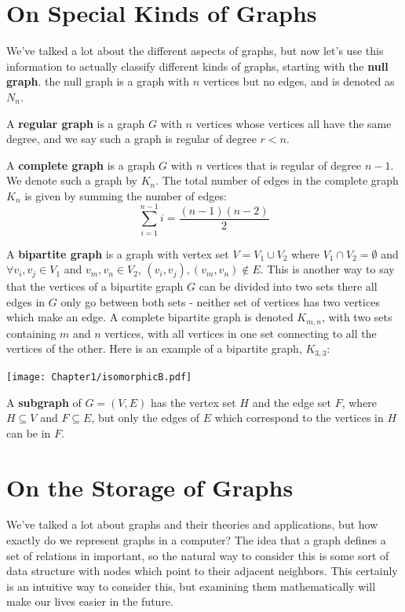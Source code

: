 \section{On Special Kinds of Graphs}
We've talked a lot about the different aspects of graphs, but now let's use this information to actually classify different kinds of graphs, starting with the \textbf{null graph}. the null graph is a graph with $n$ vertices but no edges, and is denoted as $N_n$.

A \textbf{regular graph} is a graph $G$ with $n$ vertices whose vertices all have the same degree, and we say such a graph is regular of degree $r < n$.

A \textbf{complete graph} is a graph $G$ with $n$ vertices that is regular of degree $n-1$. We denote such a graph by $K_n$. The total number of edges in the complete graph $K_n$ is given by summing the number of edges: 
\begin{equation*}
    \sum_{i=1}^{n-1} i = \frac{(n-1)(n-2)}{2}
\end{equation*}

A \textbf{bipartite graph} is a graph with vertex set $V = V_1 \cup V_2$ where $V_1 \cap V_2 = \emptyset$ and $\forall v_i, v_j \in V_1$ and $v_m, v_n \in V_2$, $(v_i, v_j), (v_m, v_n) \not\in E$. This is another way to say that the vertices of a bipartite graph $G$ can be divided into two sets there all edges in $G$ only go between both sets - neither set of vertices has two vertices which make an edge. A complete bipartite graph is denoted $K_{m, n}$, with two sets containing $m$ and $n$ vertices, with all vertices in one set connecting to all the vertices of the other. Here is an example of a bipartite graph, $K_{3, 3}$:
\begin{center}
    \texttt{[image: Chapter1/isomorphicB.pdf]}
\end{center}

A \textbf{subgraph} of $G = (V, E)$ has the vertex set $H$ and the edge set $F$, where $H \subseteq V$ and $F \subseteq E$, but only the edges of $E$ which correspond to the vertices in $H$ can be in $F$.

\section{On the Storage of Graphs}
We've talked a lot about graphs and their theories and applications, but how exactly do we represent graphs in a computer? The idea that a graph defines a set of relations in important, so the natural way to consider this is some sort of data structure with nodes which point to their adjacent neighbors. This certainly is an intuitive way to consider this, but examining them mathematically will make our lives easier in the future.

